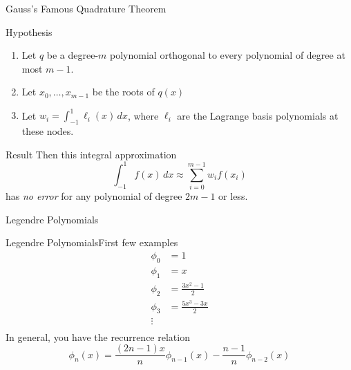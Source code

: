 \documentclass[10pt]{beamer}
\begin{document}

\begin{frame}{Gauss's Famous Quadrature Theorem}

\begin{block}{Hypothesis}
\begin{enumerate}
\item Let $q$ be a degree-$m$ polynomial orthogonal to every
polynomial of degree at most $m-1$.
\item Let $x_0,\ldots,x_{m-1}$ be the roots of $q(x)$
\item Let $w_i=\displaystyle\int_{-1}^1\ell_i(x)\,dx$,
where $\ell_i$ are the Lagrange basis polynomials at these nodes.
\end{enumerate}

\end{block}
\begin{block}{Result}
Then this integral approximation
\[
\int_{-1}^1 f(x)\,dx\approx \sum_{i=0}^{m-1}w_i f(x_i)
\]
has \textit{no error} for any polynomial of degree $2m-1$ or less.
\end{block}
\end{frame}

\begin{frame}{Legendre Polynomials}

{
}

\end{frame}

\begin{frame}{Legendre Polynomials}{First few examples}
  \begin{align*}
    \phi_0 & = 1\\
    \phi_1 & = x\\
    \phi_2 & = \frac{3x^2-1}{2}\\
    \phi_3 & = \frac{5x^3 - 3x}{2}\\
    \vdots & \\
  \end{align*}
In general, you have the recurrence relation
  \begin{equation*}
     \phi_n(x) = \frac{(2n-1)x}{n} \phi_{n-1}(x) - \frac{n-1}{n}\phi_{n-2}(x)
  \end{equation*}
\end{frame}
\end{document}
